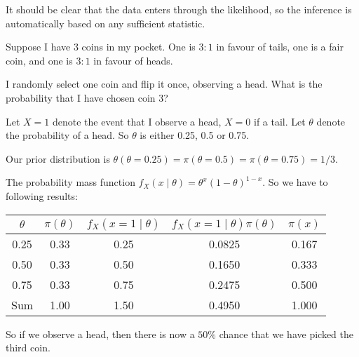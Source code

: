 \documentclass[a4paper]{article}
\begin{document}
It should be clear that the data enters through the likelihood, so the inference is automatically based on any sufficient statistic.

\begin{eg}
  Suppose I have $3$ coins in my pocket. One is $3:1$ in favour of tails, one is a fair coin, and one is $3:1$ in favour of heads.

  I randomly select one coin and flip it once, observing a head. What is the probability that I have chosen coin 3?

  Let $X = 1$ denote the event that I observe a head, $X = 0$ if a tail. Let $\theta$ denote the probability of a head. So $\theta$ is either 0.25, 0.5 or 0.75.

  Our prior distribution is $\theta(\theta = 0.25) = \pi(\theta = 0.5) = \pi(\theta = 0.75) = 1/3$.

  The probability mass function $f_X(x\mid \theta) = \theta^x(1 - \theta)^{1 - x}$. So we have to following results:
  \begin{center}
    \begin{tabular}{ccccc}
      \toprule
      $\theta$ & $\pi(\theta)$ & $f_X(x = 1\mid \theta)$ & $f_X(x = 1\mid \theta)\pi(\theta)$ & $\pi(x)$\\
      \midrule
      0.25 & 0.33 & 0.25 & 0.0825 & 0.167\\
      0.50 & 0.33 & 0.50 & 0.1650 & 0.333\\
      0.75 & 0.33 & 0.75 & 0.2475 & 0.500\\
      \midrule
      Sum & 1.00 & 1.50 & 0.4950 & 1.000\\
      \bottomrule
    \end{tabular}
  \end{center}
  So if we observe a head, then there is now a $50\%$ chance that we have picked the third coin.
\end{eg}
\end{document}
